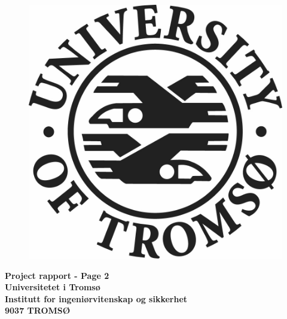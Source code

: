 \documentclass[12pt, a4paper]{article}
\begin{document}
\begin{titlepage}
\begin{figure}[!h]
\begin{minipage}[b]{0.3\textwidth}
  \end{minipage}
  \hfill
  \begin{minipage}[b]{0.3\textwidth}
    \includegraphics[width=\textwidth]{LogoEngelsk}
  \end{minipage}
\end{figure}


\end{titlepage}

\newpage

%



\textbf{\Large Project rapport - Page 2}\\

\textbf{Universitetet i Tromsø}\\
\textbf{Institutt for ingeniørvitenskap og sikkerhet}\\
\textbf{9037 TROMSØ}\\
\end{document}
